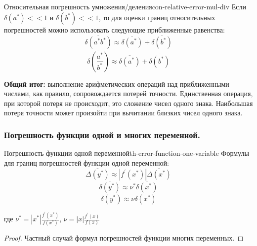 \documentclass[14pt]{extarticle}
\begin{document}
        \begin{consequence}{Относительная погрешность умножения/деления}{con-relative-error-mul-div}
            Если $\delta(a^{*}) << 1$ и $\delta(b^{*}) << 1$, то для оценки границ относительных погрешностей можно использовать следующие приближенные равенства:
            $$\overline{\delta(a^{*}b^{*})} \approx \overline{\delta(a^{*})} + \overline{\delta(b^{*})}$$
            $$\overline{\delta(\frac{a^{*}}{b^{*}})} \approx \overline{\delta(a^{*})} + \overline{\delta(b^{*})}$$
        \end{consequence}

        \textbf{Общий итог:} выполнение арифметических операций над приближенными числами, как правило, сопровождается потерей точности. Единственная операция, при которой потеря не происходит, это сложение чисел одного знака. Наибольшая потеря точности может произойти при вычитании близких чисел одного знака.

    \subsubsection{Погрешность функции одной и многих переменной.}

        \begin{theorem}{Погрешность функции одной переменной}{th-error-function-one-variable}
            Формулы для границ погрешностей функции одной переменной:
            $$\overline{\Delta(y^{*})} \approx |f^{'}(x^{*})|\overline{\Delta(x^{*})}$$
            $$\overline{\delta(y^{*})} \approx \nu^{*}\overline{\delta(x^{*})}$$
            $$\overline{\delta(y^{*})} \approx \nu \overline{\delta(x^{*})}$$
        
            где $\nu^{*} = |x^{*}| \frac{f^{'}(x^{*})}{f(x^{*})}$, $\nu = |x| \frac{f^{'}(x)}{f(x)}$
       
            \begin{proof}
                Частный случай формул погрешностей функции многих переменных.
            \end{proof}
        \end{theorem}
\end{document}
